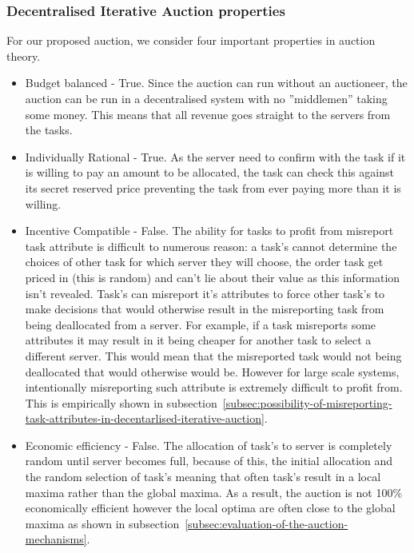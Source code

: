 \subsubsection{Decentralised Iterative Auction properties}
\label{subsubsec:decentralised-iterative-auction-properties}
For our proposed auction, we consider four important properties in auction theory.
\begin{itemize}
    \item Budget balanced - True. Since the auction can run without an auctioneer, the auction can be run in a
        decentralised system with no ''middlemen'' taking some money. This means that all revenue goes straight to
        the servers from the tasks.
    \item Individually Rational - True. As the server need to confirm with the task if it is willing to pay an amount
        to be allocated, the task can check this against its secret reserved price preventing the task from ever paying
        more than it is willing.
    \item Incentive Compatible - False. The ability for tasks to profit from misreport task attribute is difficult to
        numerous reason: a task's cannot determine the choices of other task for which server they will choose, the
        order task get priced in (this is random) and can't lie about their value as this information isn't
        revealed. Task's can misreport it's attributes to force other task's to make decisions that would otherwise
        result in the misreporting task from being deallocated from a server. For example, if a task misreports some
        attributes it may result in it being cheaper for another task to select a different server. This would mean
        that the misreported task would not being deallocated that would otherwise would be. However for large scale
        systems, intentionally misreporting such attribute is extremely difficult to profit from. This is empirically
        shown in subsection~\ref{subsec:possibility-of-misreporting-task-attributes-in-decentarlised-iterative-auction}.
    \item Economic efficiency - False. The allocation of task's to server is completely random until server becomes full,
        because of this, the initial allocation and the random selection of task's meaning that often task's result in a
        local maxima rather than the global maxima. As a result, the auction is not 100\% economically efficient
        however the local optima are often close to the global maxima as shown in
        subsection~\ref{subsec:evaluation-of-the-auction-mechanisms}.
\end{itemize}

